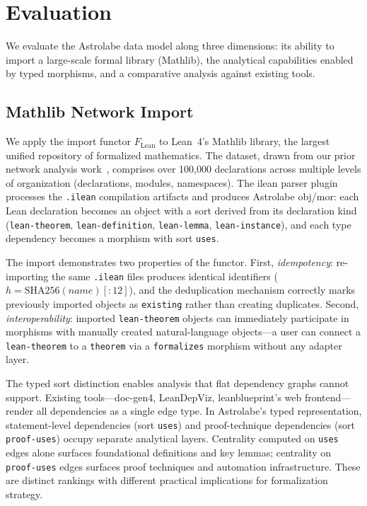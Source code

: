 \section{Evaluation}
\label{sec:evaluation}


We evaluate the Astrolabe data model along three dimensions: its ability to import a large-scale formal library (Mathlib), the analytical capabilities enabled by typed morphisms, and a comparative analysis against existing tools.


\subsection{Mathlib Network Import}
\label{sec:eval-mathlib}

We apply the import functor $F_{\mathrm{Lean}}$ to Lean~4's Mathlib library, the largest unified repository of formalized mathematics. The dataset, drawn from our prior network analysis work~\cite{LiPengSeverini2026}, comprises over 100{,}000 declarations across multiple levels of organization (declarations, modules, namespaces). The ilean parser plugin processes the \texttt{.ilean} compilation artifacts and produces Astrolabe obj/mor: each Lean declaration becomes an object with a sort derived from its declaration kind (\texttt{lean-theorem}, \texttt{lean-definition}, \texttt{lean-lemma}, \texttt{lean-instance}), and each type dependency becomes a morphism with sort \texttt{uses}.

The import demonstrates two properties of the functor. First, \emph{idempotency}: re-importing the same \texttt{.ilean} files produces identical identifiers ($h = \mathrm{SHA256}(\textit{name})[:12]$), and the deduplication mechanism correctly marks previously imported objects as \texttt{existing} rather than creating duplicates. Second, \emph{interoperability}: imported \texttt{lean-theorem} objects can immediately participate in morphisms with manually created natural-language objects---a user can connect a \texttt{lean-theorem} to a \texttt{theorem} via a \texttt{formalizes} morphism without any adapter layer.

The typed sort distinction enables analysis that flat dependency graphs cannot support. Existing tools---doc-gen4, LeanDepViz, leanblueprint's web frontend---render all dependencies as a single edge type. In Astrolabe's typed representation, statement-level dependencies (sort \texttt{uses}) and proof-technique dependencies (sort \texttt{proof-uses}) occupy separate analytical layers. Centrality computed on \texttt{uses} edges alone surfaces foundational definitions and key lemmas; centrality on \texttt{proof-uses} edges surfaces proof techniques and automation infrastructure. These are distinct rankings with different practical implications for formalization strategy.

